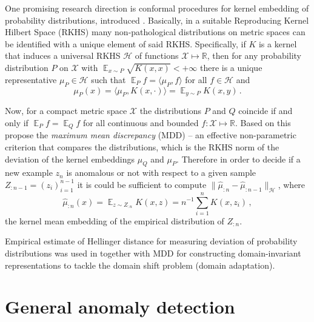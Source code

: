 \documentclass{extarticle}
\newcommand{\ex}{\mathop{\mathbb{E}}\nolimits}
\newcommand{\Hcal}{\mathcal{H}}
\newcommand{\Xcal}{\mathcal{X}}
\newcommand{\Real}{\mathbb{R}}
\begin{document}
One promising research direction is conformal procedures for kernel embedding of
probability distributions, introduced \cite{smola2007}. Basically, in a suitable
Reproducing Kernel Hilbert Space (RKHS) many non-pathological distributions on
metric spaces can be identified with a unique element of said RKHS. Specifically,
if $K$ is a kernel that induces a universal RKHS $\Hcal$ of functions $\Xcal\mapsto\Real$,
then for any probability distribution $P$ on $\Xcal$ with $\ex_{x\sim P} \sqrt{K(x,x)} < +\infty$
there is a unique representative $\mu_P\in \Hcal$ such that $\ex_P f = \langle \mu_P, f\rangle$
for all $f\in \Hcal$ and
\begin{equation*}
  \mu_P(x) = \langle \mu_P, K(x, \cdot) \rangle = \ex_{y\sim P} K(x, y) \,.
\end{equation*}

Now, for a compact metric space $\Xcal$ the distributions $P$ and $Q$ coincide if
and only if $\ex_P f = \ex_Q f$ for all continuous and bounded $f:\Xcal\mapsto \Real$.
Based on this \cite{gretton2012} propose the \textit{maximum mean discrepancy} (MDD)
-- an effective non-parametric criterion that compares the distributions, which is
the RKHS norm of the deviation of the kernel embeddings $\mu_Q$ and $\mu_P$. Therefore
in order to decide if a new example $z_n$ is anomalous or not with respect to a given
sample $Z_{:n-1} = (z_i)_{i=1}^{n-1}$ it is could be sufficient to compute
$\|\hat{\mu}_{:n} - \hat{\mu}_{:n-1}\|_\Hcal$, where
\begin{equation*}
  \hat{\mu}_{:n}(x) = \ex_{z\sim Z_{:n}} K(x, z) = n^{-1} \sum_{i=1}^n K(x, z_i) \,,
\end{equation*}
the kernel mean embedding of the empirical distribution of $Z_{:n}$.

Empirical estimate of Hellinger distance for measuring deviation of probability
distributions was used in \cite{Baktashmotlaghetal2016} together with MDD for
constructing domain-invariant representations to tackle the domain shift problem
(domain adaptation).


\section{General anomaly detection} %
\label{sec:general_anomaly_detection}



% 
\clearpage


\end{document}
